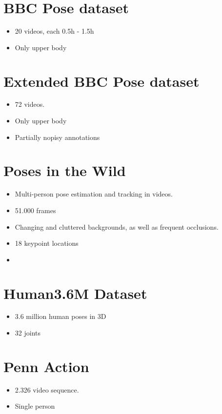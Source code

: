 \documentclass[a4paper]{report}
\begin{document}
\section*{BBC Pose dataset}
\begin{itemize}
    \item 20 videos, each 0.5h - 1.5h
    \item Only upper body
\end{itemize}

\section*{Extended BBC Pose dataset}
\begin{itemize}
    \item 72 videos. 
    \item Only upper body
    \item Partially nopisy annotations
\end{itemize}

\section*{Poses in the Wild}
\begin{itemize}
    \item Multi-person pose estimation and tracking in videos.
    \item 51.000 frames
    \item Changing and cluttered backgrounds, as well as frequent occlusions.
    \item 18 keypoint locations
    \item 
\end{itemize}

\section*{Human3.6M Dataset}
\begin{itemize}
    \item 3.6 million human poses in 3D
    \item 32 joints
\end{itemize}

\section*{Penn Action}
\begin{itemize}
    \item 2.326 video sequence.
    \item Single person
\end{itemize}
\end{document}
